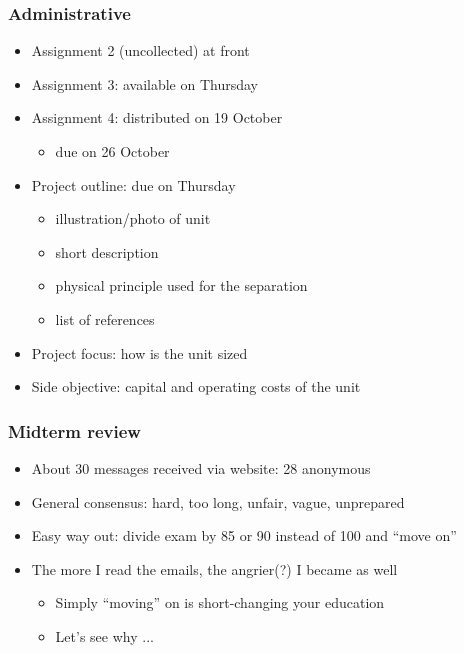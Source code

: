 \begin{frame}\frametitle{Administrative}
	\begin{itemize}
		\item	Assignment 2 (uncollected) at front
		\item	Assignment 3: available on Thursday
		\item	Assignment 4: distributed on 19 October
		\begin{itemize}
			\item	due on 26 October
		\end{itemize}
		\item	Project outline: due on Thursday
		\begin{itemize}
			\item	illustration/photo of unit
			\item	short description
			\item	physical principle used for the separation
			\item	list of references
		\end{itemize}		
		\item	Project focus: how is the unit sized
		\item	Side objective: capital and operating costs of the unit
	\end{itemize}
\end{frame}

\begin{frame}\frametitle{Midterm review}
	\begin{itemize}
		\item	About 30 messages received via website: 28 anonymous
		\item	General consensus: hard, too long, unfair, vague, unprepared
		\item	Easy way out: divide exam by 85 or 90 instead of 100 and ``move on''
		\item	The more I read the emails, the angrier(?) I became as well
			\begin{itemize}
				\item	Simply ``moving'' on is short-changing your education
				\item	Let's see why ...
			\end{itemize}
	\end{itemize}	
\end{frame}

